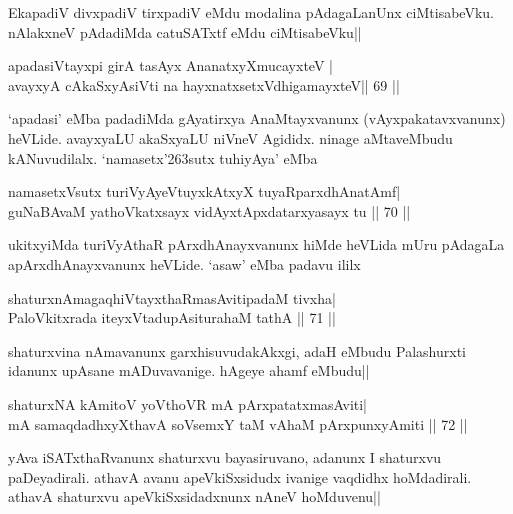 \begin{artha} 
EkapadiV divxpadiV tirxpadiV eMdu modalina pAdagaLanUnx ciMtisabeVku. 
nAlakxneV pAdadiMda catuSATxtf eMdu ciMtisabeVku||
\end{artha}

\begin{shl}
apadasiVtayxpi girA tasAyx AnanatxyXmucayxteV | \\
avayxyA cAkaSxyA\s siVti na hayxnatxsetxV\s dhigamayxteV\hfill ||  69 || 
\end{shl}

\begin{artha} 
`apadasi' eMba padadiMda gAyatirxya AnaMtayxvanunx 
(vAyxpakatavxvanunx) heVLide. avayxyaLU akaSxyaLU niVneV Agididx. 
ninage aMtaveMbudu kANuvudilalx. `namasetx\char'263sutx tuhiyAya' eMba 
\end{artha}

\begin{shl}
namasetxV\s sutx turiVyAyeVtuyxkAtxyX tuyaRparxdhAnatAmf| \\
guNaBAvaM yathoVkatxsayx vidAyxtApxdatarxyasayx tu \hfill||  70 || 
\end{shl}

\begin{artha} 
ukitxyiMda turiVyAthaR pArxdhAnayxvanunx hiMde heVLida mUru pAdagaLa 
apArxdhAnayxvanunx heVLide. `asaw' eMba padavu ililx
\end{artha}

\begin{shl}
shaturxnAmagaqhiVtayxthaRmasAvitipadaM tivxha| \\
PaloVkitxrada iteyxVtadupAsiturahaM tathA \hfill||  71 || 
\end{shl}

\begin{artha} 
shaturxvina nAmavanunx garxhisuvudakAkxgi, adaH eMbudu Palashurxti 
idanunx upAsane mADuvavanige. hAgeye ahamf eMbudu||
\end{artha}


\begin{shl}
shaturxNA kAmitoV yoV\s thoVR mA pArxpatatxmasAviti| \\
mA samaqdadhxyXthavA soV\s semxY taM vA\s haM pArxpunxyAmiti \hfill||  72 || 
\end{shl}

\begin{artha} 
yAva iSATxthaRvanunx shaturxvu bayasiruvano, adanunx I shaturxvu 
paDeyadirali. athavA avanu apeVkiSxsidudx ivanige vaqdidhx 
hoMdadirali. athavA shaturxvu apeVkiSxsidadxnunx nAneV hoMduvenu||
\end{artha}

